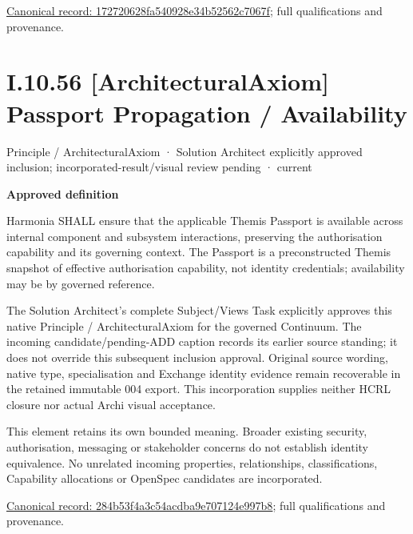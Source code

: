 {\footnotesize \href{../../../../../../../continuum/motivation/principle/architectural-axiom/172720628fa540928e34b52562c7067f.md}{Canonical record: 172720628fa540928e34b52562c7067f}; full qualifications and provenance.}\par
\section*{I.10.56 [ArchitecturalAxiom] Passport Propagation / Availability}
\label{navigation:I.10.56}

\label{element:284b53f4a3c54acdba9e707124e997b8}
{\small Principle / ArchitecturalAxiom · Solution Architect explicitly approved inclusion; incorporated-result/visual review pending · current}\par

\par\medskip\textbf{Approved definition}\par


Harmonia SHALL ensure that the applicable Themis Passport is available across internal component and subsystem interactions, preserving the authorisation capability and its governing context. The Passport is a preconstructed Themis snapshot of effective authorisation capability, not identity credentials; availability may be by governed reference.



The Solution Architect's complete Subject/Views Task explicitly approves this
native Principle / ArchitecturalAxiom for the governed Continuum.
The incoming candidate/pending-ADD caption records its earlier source standing;
it does not override this subsequent inclusion approval. Original source wording,
native type, specialisation and Exchange identity evidence remain recoverable in
the retained immutable 004 export. This incorporation supplies neither HCRL closure
nor actual Archi visual acceptance.



This element retains its own bounded meaning. Broader existing security,
authorisation, messaging or stakeholder concerns do not establish identity
equivalence. No unrelated incoming properties, relationships, classifications,
Capability allocations or OpenSpec candidates are incorporated.


{\footnotesize \href{../../../../../../../continuum/motivation/principle/architectural-axiom/284b53f4a3c54acdba9e707124e997b8.md}{Canonical record: 284b53f4a3c54acdba9e707124e997b8}; full qualifications and provenance.}\par
